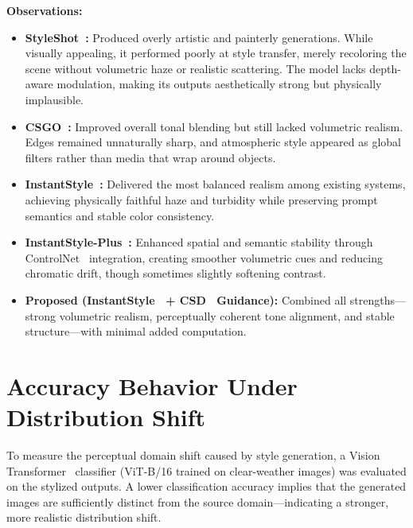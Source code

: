 \noindent
\textbf{Observations:}
\begin{itemize}
    \item \textbf{StyleShot~\cite{gao2024styleshot}:} Produced overly artistic and painterly generations. While visually appealing, it performed poorly at style transfer, merely recoloring the scene without volumetric haze or realistic scattering. The model lacks depth-aware modulation, making its outputs aesthetically strong but physically implausible.
    \item \textbf{CSGO~\cite{xing2024csgocomp}:} Improved overall tonal blending but still lacked volumetric realism. Edges remained unnaturally sharp, and atmospheric style appeared as global filters rather than media that wrap around objects.
    \item \textbf{InstantStyle~\cite{wang2024instantstyle}:} Delivered the most balanced realism among existing systems, achieving physically faithful haze and turbidity while preserving prompt semantics and stable color consistency.
    \item \textbf{InstantStyle-Plus~\cite{wang2024instantstyleplus}:} Enhanced spatial and semantic stability through ControlNet~\cite{zhang2023controlnet} integration, creating smoother volumetric cues and reducing chromatic drift, though sometimes slightly softening contrast.
    \item \textbf{Proposed (InstantStyle~\cite{wang2024instantstyle} + CSD~\cite{somepalli2024csd} Guidance):} Combined all strengths—strong volumetric realism, perceptually coherent tone alignment, and stable structure—with minimal added computation.
\end{itemize}

\section{Accuracy Behavior Under Distribution Shift}
\label{sec:accuracy_discussion}

To measure the perceptual domain shift caused by style generation, a Vision Transformer~\cite{dosovitskiy2020vit} classifier (ViT-B/16 trained on clear-weather images) was evaluated on the stylized outputs.  
A lower classification accuracy implies that the generated images are sufficiently distinct from the source domain—indicating a stronger, more realistic distribution shift.

